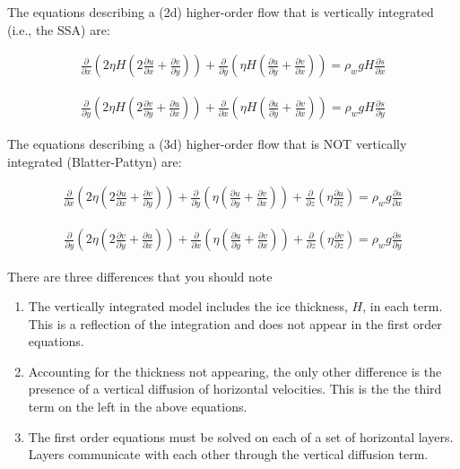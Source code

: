 The equations describing a (2d) higher-order flow that is vertically integrated (i.e., the SSA) are:

\begin{align*}
\frac{\partial}{\partial x}\left ( 2 \eta H 
\left(2\frac{\partial u}{\partial x}+\frac{\partial v}{\partial y}\right)\right)
+\frac{\partial}{\partial y}\left(\eta H\left(
\frac{\partial u}{\partial y}+\frac{\partial v}{\partial x}\right)\right)
=\rho_w gH \frac{\partial s}{\partial x}
\end{align*}


\begin{align*}
\frac{\partial}{\partial y}\left ( 2 \eta H 
\left(2\frac{\partial v}{\partial y}+\frac{\partial u}{\partial x}\right)\right)
+\frac{\partial}{\partial x}\left(\eta H\left(
\frac{\partial u}{\partial y}+\frac{\partial v}{\partial x}\right)\right)
=\rho_w gH \frac{\partial s}{\partial y}
\end{align*}

The equations describing a (3d) higher-order flow that is NOT vertically integrated (Blatter-Pattyn) are:

\begin{align*}
\frac{\partial}{\partial x}\left ( 2 \eta  
\left(2\frac{\partial u}{\partial x}+\frac{\partial v}{\partial y}\right)\right)
+\frac{\partial}{\partial y}\left(\eta \left(
\frac{\partial u}{\partial y}+\frac{\partial v}{\partial x}\right)\right)
+\frac{\partial}{\partial z}\left(\eta \frac{\partial u}{\partial z}\right)
=\rho_w g \frac{\partial s}{\partial x}
\end{align*}


\begin{align*}
\frac{\partial}{\partial y}\left ( 2 \eta 
\left(2\frac{\partial v}{\partial y}+\frac{\partial u}{\partial x}\right)\right)
+\frac{\partial}{\partial x}\left(\eta \left(
\frac{\partial u}{\partial y}+\frac{\partial v}{\partial x}\right)\right)
+\frac{\partial}{\partial z}\left(\eta \frac{\partial v}{\partial z}\right)
=\rho_w g \frac{\partial s}{\partial y}
\end{align*}

There are three differences that you should note
\begin{enumerate}
\item  The vertically integrated model includes the ice thickness, $H$, in each term. This is a reflection of the integration and does not appear in the first order equations.
\item  Accounting for the thickness not appearing, the only other difference is the presence of a vertical diffusion of horizontal velocities. This is the the third term on the left in the above equations.
\item  The first order equations must be solved on each of a set of horizontal layers. Layers communicate with each other through the vertical diffusion term.
\end{enumerate}

